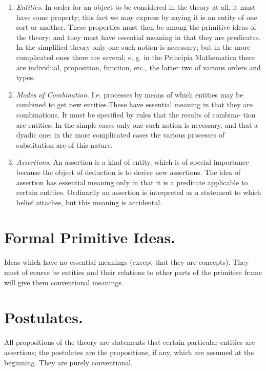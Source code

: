 \documentclass[9pt, twoside]{extarticle}
\newcommand{\td}[2][] {\todo[tickmarkheight=3pt, inline, size=\tiny, #1]{#2}}
\newcommand\litem[1]{\item{\textit{#1}.}}
\begin{document}
\td{proper counting in named items}
\begin{enumerate}[label=\arabic*.,font=\itshape,wide]
\litem{Entities} In order for an object to be considered in the theory at
all, it must have some property; this fact we may express by saying it is
an entity of one sort or another. These properties must then be among the
primitive ideas of the theory; and they must have essential meaning in
that they are predicates. In the simplified theory only one such notion is
necessary; but in the more complicated ones there are several; e. g. in the
Principia Mathematica there are individual, proposition, function, etc., the
latter two of various orders and types.

\litem{Modes of Combination} I.e. processes by means of which entities may
be combined to get new entities.These have essential meaning in that they
are combinations. It must be specified by rules that the results of combina-
tion are entities. In the simple cases only one such notion is necessary, and
that a dyadic one; in the more complicated cases the various processes of
substitution are of this nature.

\litem{Assertions} An assertion is a kind of entity, which is of special
importance because the object of deduction is to derive new assertions. The
idea of assertion has essential meaning only in that it is a predicate applicable
to certain entities. Ordinarily an assertion is interpreted as a statement to
which belief attaches, but this meaning is accidental.
\end{enumerate}

\section{Formal Primitive Ideas.}
Ideas which have no essential meanings (except that they are concepts).
They must of course be entities and their relations to other parts of the
primitive frame will give them conventional meanings.

\section{Postulates.}
All propositions of the theory are statements that certain particular
entities are assertions; the postulates are the propositions, if any, which are
assumed at the beginning. They are purely conventional.
\end{document}
